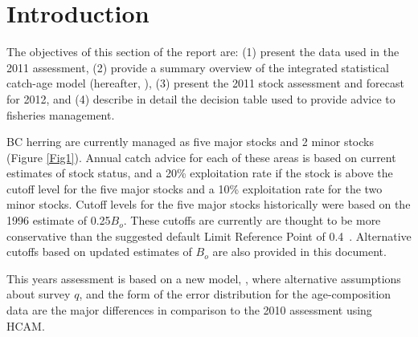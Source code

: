 

\section{Introduction}

The objectives of this section of the report are: (1) present the data used in the 2011 assessment, (2) provide a summary overview of the integrated statistical catch-age model (hereafter, \iscam), (3) present the 2011 stock assessment and forecast for 2012, and (4) describe in detail the decision table used to provide advice to fisheries management.

BC herring are currently managed as five major stocks and 2 minor stocks (Figure \ref{Fig1}).  Annual catch advice for each of these areas is based on current estimates of stock status, and a 20\% exploitation rate if the stock is above the cutoff level for the five major stocks and a 10\% exploitation rate for the two minor stocks.  Cutoff levels for the five major stocks historically were based on the 1996 estimate of  0.25$B_o$.  These cutoffs are currently are thought to be more conservative 	than the suggested default Limit Reference Point of 0.4\bmsy\ \citep{dfo2006}.  Alternative cutoffs based on updated estimates of $B_o$ are also provided in this document.

This years assessment is based on a new model, \iscam, where alternative assumptions about survey $q$, and the form of the error distribution for the age-composition data are the major differences in comparison to the 2010 assessment using HCAM.



